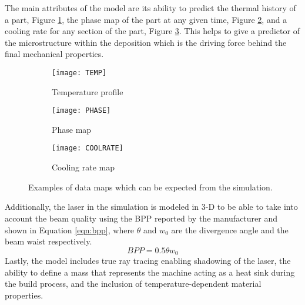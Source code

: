 The main attributes of the model are its ability to predict the thermal history of a part, Figure \ref{fig:TEMP}, the phase map of the part at any given time, Figure \ref{fig:PHASE}, and a cooling rate for any section of the part, Figure \ref{fig:COOLRATE}.  This helps to give a predictor of the microstructure within the deposition which is the driving force behind the final mechanical properties. 
\begin{figure}[!htb]\centering
    \begin{subfigure}[c]{0.3\textwidth}
	\centering
	\texttt{[image: TEMP]}
	\caption{Temperature profile}
	\label{fig:TEMP}
    \end{subfigure}
        \begin{subfigure}[c]{0.3\textwidth}
    	\centering
    	\texttt{[image: PHASE]}
    	\caption{Phase map}
    	\label{fig:PHASE}
        \end{subfigure}
            \begin{subfigure}[c]{0.3\textwidth}
            \centering
        	\texttt{[image: COOLRATE]}
        	\caption{Cooling rate map}
        	\label{fig:COOLRATE}
            \end{subfigure}
	\caption{Examples of data maps which can be expected from the simulation.}
	\label{fig:data_maps}	
\end{figure}
Additionally, the laser in the simulation is modeled in 3-D to be able to take into account the beam quality using the \ac{BPP} reported by the manufacturer and shown in Equation \ref{eqn:bpp}, where $\theta$ and $w_0$ are the divergence angle and the beam waist respectively.
\begin{equation}\label{eqn:bpp}
	BPP = 0.5 \theta w_0
\end{equation} 
Lastly, the model includes true ray tracing enabling shadowing of the laser, the ability to define a mass that represents the machine acting as a heat sink during the build process, and the inclusion of temperature-dependent material properties.

